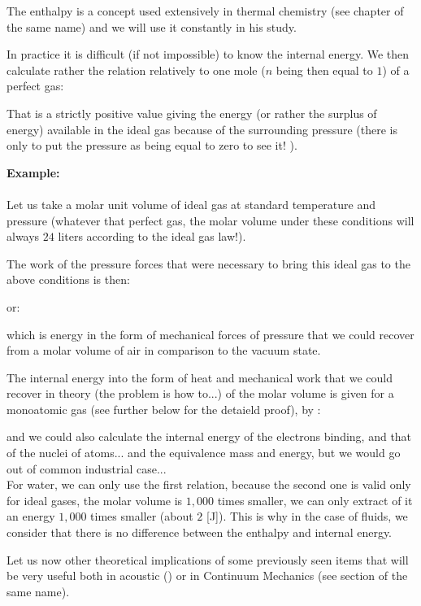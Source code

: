 	The enthalpy is a concept used extensively in thermal chemistry (see chapter of the same name) and we will use it constantly in his study.

	In practice it is difficult (if not impossible) to know the internal energy. We then calculate rather the relation relatively to one mole ($n$ being then equal to $1$) of a perfect gas:
	
	That is a strictly positive value giving the energy (or rather the surplus of energy) available in the ideal gas because of the surrounding pressure (there is only to put the pressure as being equal to zero to see it! ).
	
	\begin{tcolorbox}[colframe=black,colback=white,sharp corners]
	\textbf{{\Large {}}Example:}\\\\
	Let us take a molar unit volume of ideal gas at standard temperature and pressure (whatever that perfect gas, the molar volume under these conditions will always $24$ liters according to the ideal gas law!).

	The work of the pressure forces that were necessary to bring this ideal gas to the above conditions is then:
	
	or:
	
	which is energy in the form of mechanical forces of pressure that we could recover from a molar volume of air in comparison to the vacuum state.

	The internal energy into the form of heat and mechanical work that we could recover in theory (the problem is how to...) of the molar volume is given for a monoatomic gas (see further below for the detaield proof), by :
	
	and we could also calculate the internal energy of the electrons binding, and that of the nuclei of atoms... and the equivalence mass and energy, but we would go out of common industrial case...\\

	For water, we can only use the first relation, because the second one is valid only for ideal gases, the molar volume is $1,000$ times smaller, we can only extract of it an energy $1,000$ times smaller (about $2$ [J]). This is why in the case of fluids, we consider that there is no difference between the enthalpy and internal energy.
	\end{tcolorbox}
	Let us now other theoretical implications of some previously seen items that will be very useful both in acoustic () or in Continuum Mechanics (see section of the same name).
	
